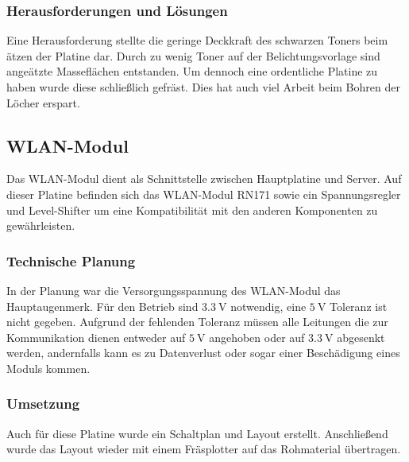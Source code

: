     \subsubsection{Herausforderungen und Lösungen}
    Eine Herausforderung stellte die geringe Deckkraft des schwarzen Toners beim ätzen der Platine dar. Durch zu wenig Toner auf der Belichtungsvorlage sind
    angeätzte Masseflächen entstanden. Um dennoch eine ordentliche Platine zu haben wurde diese schließlich gefräst. Dies hat auch viel Arbeit beim Bohren der
    Löcher erspart.

  \subsection{WLAN-Modul}
  Das WLAN-Modul dient als Schnittstelle zwischen Hauptplatine und Server. Auf dieser Platine befinden sich das WLAN-Modul RN171 sowie ein Spannungsregler und Level-Shifter
  um eine Kompatibilität mit den anderen Komponenten zu gewährleisten.

    \subsubsection{Technische Planung}
    In der Planung war die Versorgungsspannung des WLAN-Modul das Hauptaugenmerk. Für den Betrieb sind $\SI{3.3}{\volt}$ notwendig, eine $\SI{5}{\volt}$ Toleranz ist nicht gegeben.
    Aufgrund der fehlenden Toleranz müssen alle Leitungen die zur Kommunikation dienen entweder auf $\SI{5}{\volt}$ angehoben oder auf $\SI{3.3}{\volt}$ abgesenkt werden,
    andernfalls kann es zu Datenverlust oder sogar einer Beschädigung eines Moduls kommen.

    \subsubsection{Umsetzung}
    Auch für diese Platine wurde ein Schaltplan und Layout erstellt. Anschließend wurde das Layout wieder mit einem Fräsplotter auf das Rohmaterial übertragen.

